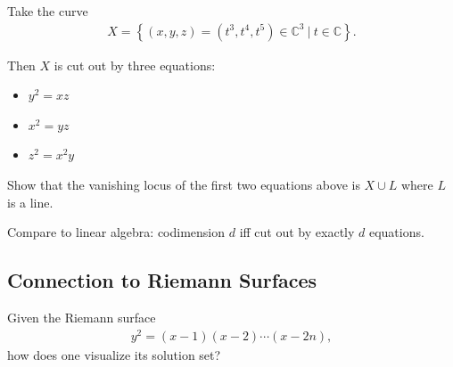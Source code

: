 \begin{example}

Take the curve
\begin{align*}  
X = \left\{{(x, y, z) = (t^3, t^4, t^5) \in {\mathbb{C}}^3 {~\mathrel{\Big|}~}t\in {\mathbb{C}}}\right\}
.\end{align*}

Then \(X\) is cut out by three equations:

\begin{itemize}
\tightlist
\item
  \(y^2 = xz\)
\item
  \(x^2 = yz\)
\item
  \(z^2 = x^2 y\)
\end{itemize}

\end{example}

\begin{exercise}

Show that the vanishing locus of the first two equations above is
\(X\cup L\) where \(L\) is a line.

\end{exercise}

Compare to linear algebra: codimension \(d\) iff cut out by exactly
\(d\) equations.

\hypertarget{connection-to-riemann-surfaces}{%
\subsection{Connection to Riemann
Surfaces}\label{connection-to-riemann-surfaces}}

\begin{example}

Given the Riemann surface
\begin{align*}  
y^2 = (x-1)(x-2)\cdots(x-2n)
,\end{align*}
how does one visualize its solution set?

\end{example}

